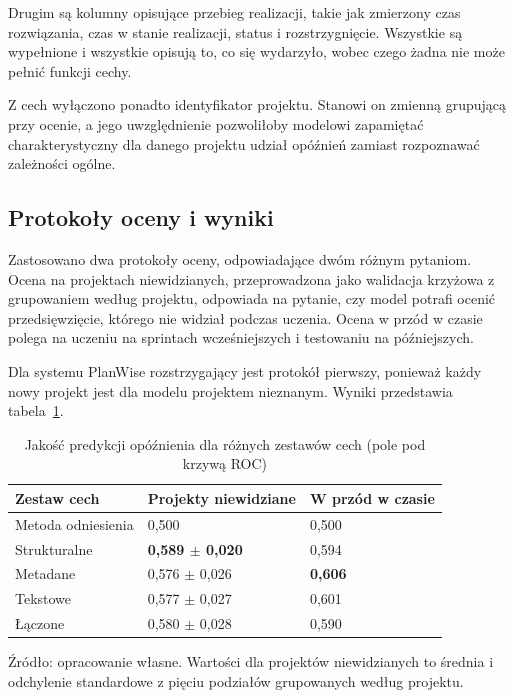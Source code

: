 Drugim są kolumny opisujące przebieg realizacji, takie jak zmierzony czas rozwiązania, czas w stanie realizacji, status i rozstrzygnięcie. Wszystkie są wypełnione i wszystkie opisują to, co się wydarzyło, wobec czego żadna nie może pełnić funkcji cechy.

Z cech wyłączono ponadto identyfikator projektu. Stanowi on zmienną grupującą przy ocenie, a jego uwzględnienie pozwoliłoby modelowi zapamiętać charakterystyczny dla danego projektu udział opóźnień zamiast rozpoznawać zależności ogólne.

\subsection{Protokoły oceny i wyniki}
\label{subsec:protokoly-oceny}

Zastosowano dwa protokoły oceny, odpowiadające dwóm różnym pytaniom. Ocena na projektach niewidzianych, przeprowadzona jako walidacja krzyżowa z grupowaniem według projektu, odpowiada na pytanie, czy model potrafi ocenić przedsięwzięcie, którego nie widział podczas uczenia. Ocena w przód w czasie polega na uczeniu na sprintach wcześniejszych i testowaniu na późniejszych.

Dla systemu PlanWise rozstrzygający jest protokół pierwszy, ponieważ każdy nowy projekt jest dla modelu projektem nieznanym. Wyniki przedstawia tabela~\ref{tab:wyniki-tawos}.

\begin{table}[htbp]
    \centering
    \small
    \caption{Jakość predykcji opóźnienia dla różnych zestawów cech (pole pod krzywą ROC)}
    \label{tab:wyniki-tawos}
    \begin{tabularx}{\textwidth}{@{}Xll@{}}
        \toprule
        \textbf{Zestaw cech} & \textbf{Projekty niewidziane} & \textbf{W przód w czasie} \\
        \midrule
        Metoda odniesienia & 0,500 & 0,500 \\
        Strukturalne & \textbf{0,589 $\pm$ 0,020} & 0,594 \\
        Metadane & 0,576 $\pm$ 0,026 & \textbf{0,606} \\
        Tekstowe & 0,577 $\pm$ 0,027 & 0,601 \\
        Łączone & 0,580 $\pm$ 0,028 & 0,590 \\
        \bottomrule
    \end{tabularx}

    \par\smallskip
    \begin{minipage}{\textwidth}
        \footnotesize
        Źródło: opracowanie własne. Wartości dla projektów niewidzianych to średnia
        i odchylenie standardowe z pięciu podziałów grupowanych według projektu.
    \end{minipage}
\end{table}

